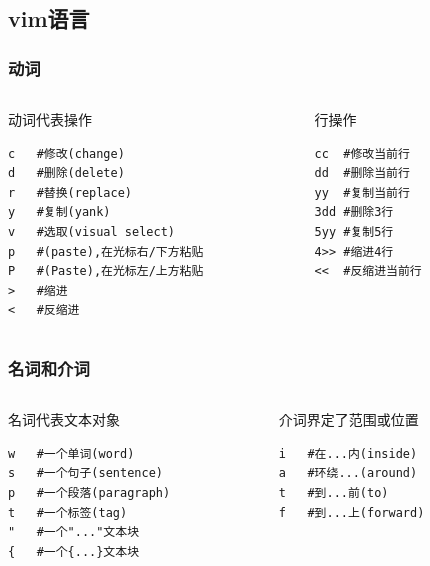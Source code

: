 \documentclass[xcolor=svgnames,presentation]{beamer}
\begin{document}
\subsection{vim语言}
\label{sec-4-4}
\begin{frame}[fragile]
\frametitle{动词}
\label{sec-4-4-1}
\begin{columns}
\begin{column}{0.6\textwidth}
\begin{exampleblock}{动词代表操作}
\label{sec-4-4-1-1}


\begin{verbatim}
c   #修改(change)
d   #删除(delete)
r   #替换(replace)
y   #复制(yank)
v   #选取(visual select)
p   #(paste),在光标右/下方粘贴
P   #(Paste),在光标左/上方粘贴
>   #缩进
<   #反缩进
\end{verbatim}
\end{exampleblock}
\end{column}
\begin{column}{0.4\textwidth}
\begin{block}{行操作}
\label{sec-4-4-1-2}


\begin{verbatim}
cc  #修改当前行
dd  #删除当前行
yy  #复制当前行
3dd #删除3行
5yy #复制5行
4>> #缩进4行
<<  #反缩进当前行
\end{verbatim}
\end{block}
\end{column}
\end{columns}
\end{frame}
\begin{frame}[fragile]
\frametitle{名词和介词}
\label{sec-4-4-2}
\begin{columns}
\begin{column}{0.5\textwidth}
\begin{exampleblock}{名词代表文本对象}
\label{sec-4-4-2-1}


\begin{verbatim}
w   #一个单词(word)
s   #一个句子(sentence)
p   #一个段落(paragraph)
t   #一个标签(tag)
"   #一个"..."文本块
{   #一个{...}文本块
\end{verbatim}
\end{exampleblock}
\end{column}
\begin{column}{0.5\textwidth}
\begin{block}{介词界定了范围或位置}
\label{sec-4-4-2-2}


\begin{verbatim}
i   #在...内(inside)
a   #环绕...(around)
t   #到...前(to)
f   #到...上(forward)
\end{verbatim}
\end{block}
\end{column}
\end{columns}
\end{frame}
\end{document}
